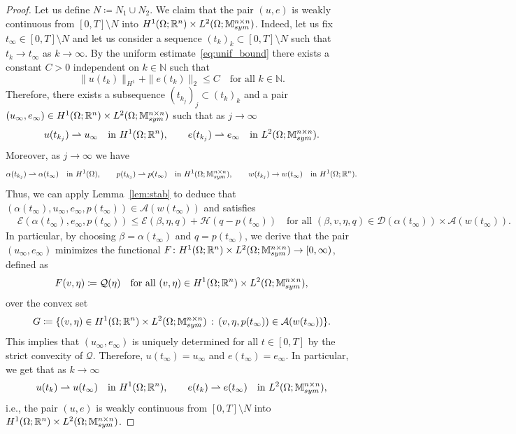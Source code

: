 \documentclass[reqno]{amsart}
\theoremstyle{definition}
\numberwithin{equation}{section}
\def\R {\mathbb R}
\def\N {\mathbb N}
\def\M {\mathbb M^{n\times n}_{\rm sym}}
\begin{document}
\begin{proof}
Let us define $N\coloneqq N_1\cup N_2$. We claim that the pair $(u,e)$ is weakly continuous from $[0,T]\setminus N$ into $H^1(\Omega;\R^n)\times L^2(\Omega;\M)$. Indeed, let us fix $t_\infty\in [0,T]\setminus N$ and let us consider a sequence $(t_k)_k\subset [0,T]\setminus N$ such that $t_k\to t_\infty$ as $k\to\infty$. By the uniform estimate~\eqref{eq:unif_bound} there exists a constant $C>0$ independent on $k\in\N$ such that 
$$\|u(t_k)\|_{H^1}+\|e(t_k)\|_2\le C\quad\text{for all $k\in\N$}.$$
Therefore, there exists a subsequence $(t_{k_j})_j\subset(t_k)_k$ and a pair $(u_\infty,e_\infty)\in H^1(\Omega;\R^n)\times L^2(\Omega;\M)$ such that as $j\to\infty$
\begin{align*}
u(t_{k_j})\rightharpoonup u_\infty\quad\text{in $H^1(\Omega;\R^n)$},\qquad e(t_{k_j})\rightharpoonup e_\infty\quad\text{in $L^2(\Omega;\M)$}.
\end{align*}
Moreover, as $j\to\infty$ we have
\begin{align*}
\alpha(t_{k_j})\rightharpoonup \alpha(t_\infty)\quad\text{in $H^1(\Omega)$},\qquad p(t_{k_j})\rightharpoonup p(t_\infty)\quad\text{in $H^1(\Omega;\M)$},\qquad
w(t_{k_j})\to w(t_\infty)\quad\text{in $H^1(\Omega;\R^n)$}.
\end{align*}
Thus, we can apply Lemma~\ref{lem:stab} to deduce that $(\alpha(t_\infty),u_\infty,e_\infty,p(t_\infty))\in\mathcal A(w(t_\infty))$ and satisfies 
\begin{align*}
&\mathcal E(\alpha(t_\infty),e_\infty,p(t_\infty))\le \mathcal E(\beta,\eta,q)+\mathcal H(q-p(t_\infty))\quad\text{for all $(\beta,v,\eta,q)\in \mathcal D(\alpha(t_\infty))\times \mathcal A(w(t_\infty))$.}
\end{align*}
In particular, by choosing $\beta=\alpha(t_\infty)$ and $q=p(t_\infty)$, we derive that the pair $(u_\infty,e_\infty)$ minimizes the functional $F\colon H^1(\Omega;\R^n)\times L^2(\Omega;\M)\to [0,\infty)$, defined as 
$$F(v,\eta)\coloneqq \mathcal Q(\eta)\quad\text{for all $(v,\eta)\in H^1(\Omega;\R^n)\times L^2(\Omega;\M)$},$$
over the convex set 
$$G\coloneqq \{(v,\eta)\in H^1(\Omega;\R^n)\times L^2(\Omega;\M)\,:\, (v,\eta,p(t_\infty))\in\mathcal A(w(t_\infty))\}.$$
This implies that $(u_\infty,e_\infty)$ is uniquely determined for all $t\in[0,T]$ by the strict convexity of $\mathcal Q$. Therefore, $u(t_\infty)=u_\infty$ and $e(t_\infty)=e_\infty$. In particular, we get that as $k\to\infty$
\begin{align*}
u(t_k)\rightharpoonup u(t_\infty)\quad\text{in $H^1(\Omega;\R^n)$},\qquad e(t_k)\rightharpoonup e(t_\infty)\quad\text{in $L^2(\Omega;\M)$},
\end{align*}
i.e., the pair $(u,e)$ is weakly continuous from $[0,T]\setminus N$ into $H^1(\Omega;\R^n)\times L^2(\Omega;\M)$. 
\end{proof}
\end{document}
